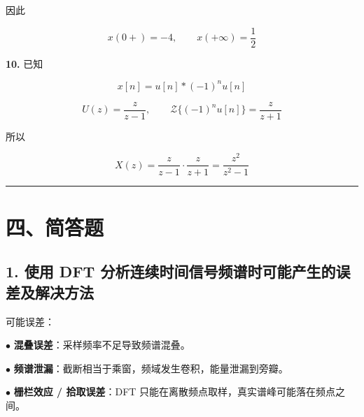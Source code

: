 \documentclass[11pt]{ctexart}
\begin{document}
因此\par



\[

   x(0+)=-4,\qquad x(+\infty)=\frac12

   \]



\noindent\textbf{10.} 已知\par



\[

   x[n]=u[n]*(-1)^nu[n]

   \]



\[

   U(z)=\frac{z}{z-1},\qquad \mathcal{Z}\{(-1)^nu[n]\}=\frac{z}{z+1}

   \]



所以\par



\[

   X(z)=\frac{z}{z-1}\cdot\frac{z}{z+1}

   =\frac{z^2}{z^2-1}

   \]



\medskip\hrule\medskip



\section*{四、简答题}



\subsection*{1. 使用 DFT 分析连续时间信号频谱时可能产生的误差及解决方法}



可能误差：\par



\noindent\(\bullet\) \textbf{混叠误差}：采样频率不足导致频谱混叠。\par

\noindent\(\bullet\) \textbf{频谱泄漏}：截断相当于乘窗，频域发生卷积，能量泄漏到旁瓣。\par

\noindent\(\bullet\) \textbf{栅栏效应 / 拾取误差}：DFT 只能在离散频点取样，真实谱峰可能落在频点之间。\par
\end{document}
